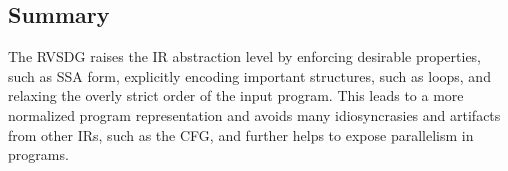 \subsection{Summary}

The RVSDG raises the IR abstraction level by enforcing desirable properties, such as
SSA form, explicitly encoding important structures, such as loops, and relaxing the overly strict
order of the input program. This leads to a more normalized program representation and avoids
many idiosyncrasies and artifacts from other IRs, such as the CFG, and further helps to expose
parallelism in programs.

